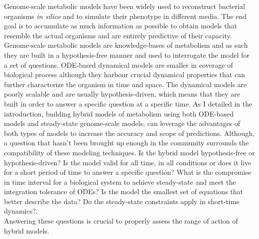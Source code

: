 Genome-scale metabolic models have been widely used to reconstruct bacterial organisms  \textit{in silico} and to simulate their phenotype in different media. The end goal is to accumulate as much information as possible to obtain models that resemble the actual organisms and are entirely predictive of their capacity. Genome-scale metabolic models are knowledge-bases of metabolism and as such they are built in a hypothesis-free manner and used to interrogate the model for a set of questions. ODE-based dynamical models are smaller in coverage of biological process although they harbour crucial dynamical properties that can further characterize the organism in time and space. The dynamical models are poorly scalable and are usually hypothesis-driven, which means that they are built in order to answer a specific question at a specific time. As I detailed in the introduction, building hybrid models of metabolism using both ODE-based models and  steady-state genome-scale models, can leverage the advantages of both types of models to increase the accuracy and scope of predictions. Although, a question that hasn't been brought up enough in the community surrounds the compatibility of these modeling techniques. Is the hybrid model hypothesis-free or hypothesis-driven? Is the model valid for all time, in all conditions or does it live for a short period of time to answer a specific question? What is the compromise in time interval for a biological system to achieve steady-state and meet the integration tolerance of ODEs? Is the model the smallest set of equations that better describe the data? Do the steady-state constraints apply in short-time dynamics?.\\
Answering these questions is crucial to properly assess the range of action of hybrid models. 
